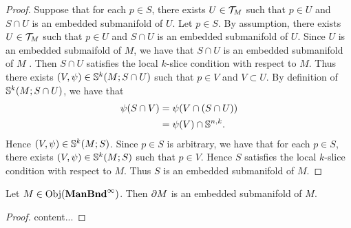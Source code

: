 \documentclass{book}
\begin{document}
	\begin{proof}
		Suppose that for each $p \in S$, there exists $U \in \MT_M$ such that $p \in U$ and $S \cap U$ is an embedded submanifold of $U$. Let $p \in S$. By assumption, there exists $U \in \MT_M$ such that $p \in U$ and $S \cap U$ is an embedded submanifold of $U$. Since $U$ is an embedded submaifold of $M$, we have that $S \cap U$ is an embedded submanifold of $M$ . Then $S \cap U$ satisfies the local $k$-slice condition with respect to $M$. Thus there exists $(V, \psi) \in \S^k(M; S \cap U)$ such that $p \in V$ and $V \subset U$. By definition of $\S^k(M; S \cap U)$, we have that 
		\begin{align*}
			\psi(S \cap V)
			& = \psi(V \cap (S \cap U)) \\
			& = \psi(V) \cap \S^{n,k}.
		\end{align*}
		Hence $(V, \psi) \in \S^k(M; S)$. Since $p \in S$ is arbitrary, we have that for each $p \in S$, there exists $(V, \psi) \in \S^k(M; S)$ such that $p \in V$. Hence $S$ satisfies the local $k$-slice condition with respect to $M$. Thus $S$ is an embedded submanifold of $M$. 
	\end{proof}


	\begin{ex} 
		 Let $M \in \Obj(\bManBndinf)$. Then $\p M$ is an embedded submanifold of $M$.  
	\end{ex}	
	
	\begin{proof}
		content... 
	\end{proof}
	
\end{document}
